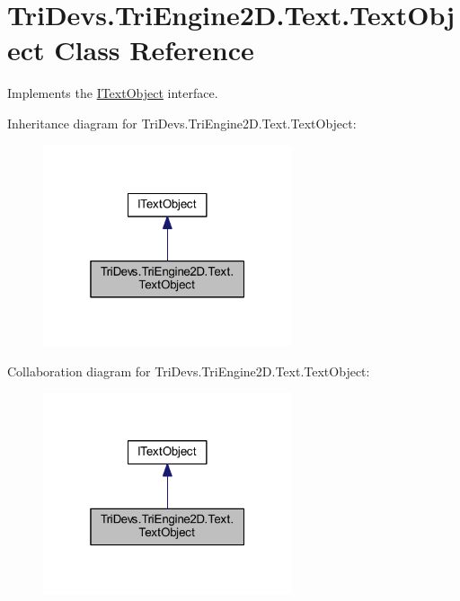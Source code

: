 \hypertarget{class_tri_devs_1_1_tri_engine2_d_1_1_text_1_1_text_object}{\section{Tri\-Devs.\-Tri\-Engine2\-D.\-Text.\-Text\-Object Class Reference}
\label{class_tri_devs_1_1_tri_engine2_d_1_1_text_1_1_text_object}
}


Implements the \hyperlink{interface_tri_devs_1_1_tri_engine2_d_1_1_text_1_1_i_text_object}{I\-Text\-Object} interface.  




Inheritance diagram for Tri\-Devs.\-Tri\-Engine2\-D.\-Text.\-Text\-Object\-:
\nopagebreak
\begin{figure}[H]
\begin{center}
\leavevmode
\includegraphics[width=208pt]{class_tri_devs_1_1_tri_engine2_d_1_1_text_1_1_text_object__inherit__graph}
\end{center}
\end{figure}


Collaboration diagram for Tri\-Devs.\-Tri\-Engine2\-D.\-Text.\-Text\-Object\-:
\nopagebreak
\begin{figure}[H]
\begin{center}
\leavevmode
\includegraphics[width=208pt]{class_tri_devs_1_1_tri_engine2_d_1_1_text_1_1_text_object__coll__graph}
\end{center}
\end{figure}
